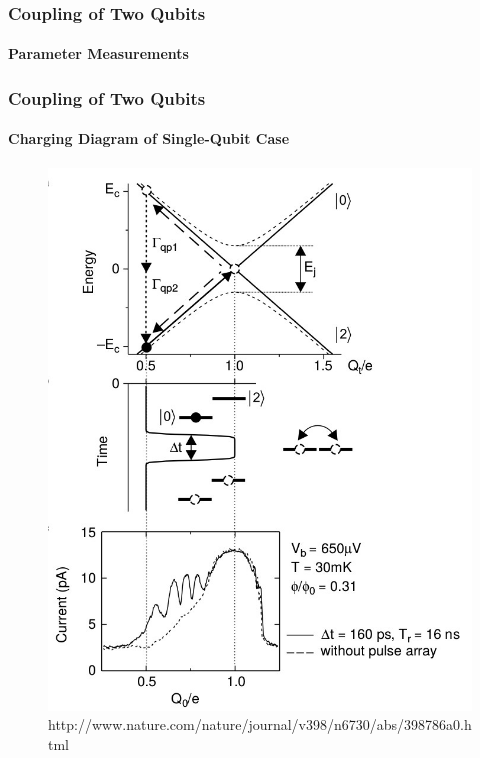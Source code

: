 \documentclass{beamer}
\begin{document}

\begin{frame}
    \frametitle{Coupling of Two Qubits}
    \framesubtitle{Parameter Measurements}
\end{frame}


\begin{frame}
    \frametitle{Coupling of Two Qubits}
    \framesubtitle{Charging Diagram of Single-Qubit Case}
        \begin{figure}[ht!]
            \centering
            \includegraphics[height=0.6\textheight]{img/single-qubit-band-diagram.jpg}
            \caption{http://www.nature.com/nature/journal/v398/n6730/abs/398786a0.html}
        \end{figure}
\end{frame}

\end{document}
